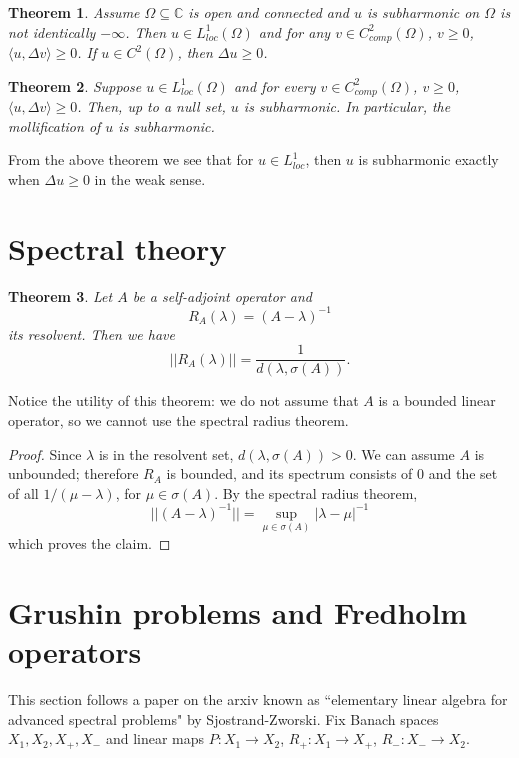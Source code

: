 \documentclass[12pt]{report}
\newcommand{\CC}{\mathbb{C}}
\newtheorem{theorem}{Theorem}[chapter]
\theoremstyle{definition}
\begin{document}
\begin{theorem}
    Assume $\Omega \subseteq \CC$ is open and connected and $u$ is subharmonic on $\Omega$ is not identically $-\infty$. Then $u \in L^1_{loc}(\Omega)$ and for any $v \in C^2_{comp}(\Omega)$, $v \geq 0$, $\langle u, \Delta v\rangle \geq 0$. If $u \in C^2(\Omega)$, then $\Delta u \geq 0$.
\end{theorem}
\begin{theorem}
    Suppose $u \in L^1_{loc}(\Omega)$ and for every $v \in C^2_{comp}(\Omega)$, $v \geq 0$, $\langle u, \Delta v \rangle \geq 0$. Then, up to a null set, $u$ is subharmonic. In particular, the mollification of $u$ is subharmonic.
\end{theorem}
From the above theorem we see that for $u \in L^1_{loc}$, then $u$ is subharmonic exactly when $\Delta u \geq 0$ in the weak sense.



\section{Spectral theory}
\begin{theorem}
\label{norm of the resolvent}
Let $A$ be a self-adjoint operator and
$$R_A(\lambda) = (A - \lambda)^{-1}$$
its resolvent. Then we have
$$||R_A(\lambda)|| = \frac{1}{d(\lambda, \sigma(A))}.$$
\end{theorem}
Notice the utility of this theorem: we do not assume that $A$ is a bounded linear operator, so we cannot use the spectral radius theorem.
\begin{proof}
Since $\lambda$ is in the resolvent set, $d(\lambda, \sigma(A)) > 0$. We can assume $A$ is unbounded; therefore $R_A$ is bounded, and its spectrum consists of $0$ and the set of all $1/(\mu - \lambda)$, for $\mu \in \sigma(A)$. By the spectral radius theorem,
$$||(A - \lambda)^{-1}|| = \sup_{\mu \in \sigma(A)} |\lambda - \mu|^{-1}$$
which proves the claim.
\end{proof}


\section{Grushin problems and Fredholm operators}
This section follows a paper on the arxiv known as ``elementary linear algebra for advanced spectral problems" by Sjostrand-Zworski. Fix Banach spaces $X_1,X_2,X_+,X_-$ and linear maps $P: X_1 \to X_2$, $R_+: X_1 \to X_+$, $R_-: X_- \to X_2$.
\end{document}
